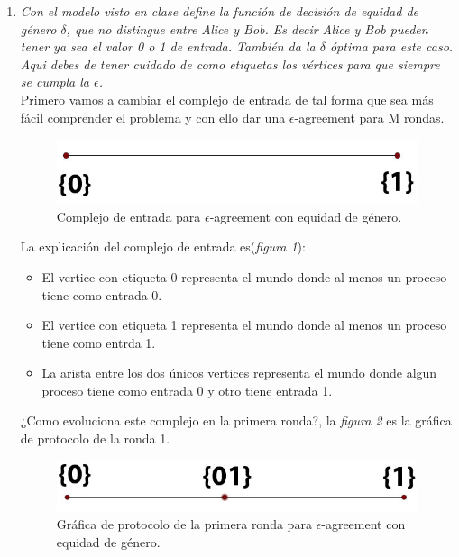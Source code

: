 \documentclass{article}
\begin{document}
\begin{enumerate}
\item{
    \textsl{
    Con el modelo visto en clase define la función de decisión de equidad de género
    $\delta$, que no distingue entre Alice y Bob. Es decir Alice y Bob pueden tener
    ya sea el valor 0 o 1 de entrada. También da la $\delta$ óptima para este caso.
    Aqui debes de tener cuidado de como etiquetas los vértices para que siempre
    se cumpla la $\epsilon$.}\\
  
    Primero vamos a cambiar el complejo de entrada de tal forma que sea más fácil 
    comprender el problema y con ello dar una $\epsilon$-agreement para M rondas.\\
    
     \begin{figure}
       \centering
       \includegraphics[scale=0.25]{2_input.png}
       \caption{Complejo de entrada para $\epsilon$-agreement con equidad de género.}
     \end{figure}

     La explicación del complejo de entrada es(\textit{figura 1}):
     
     \begin{itemize}
       \item{El vertice con etiqueta {0} representa el mundo donde al menos un proceso
           tiene como entrada 0.}
       \item{El vertice con etiqueta {1} representa el mundo donde al menos un proceso
           tiene como entrda 1.}
       \item{La arista entre los dos únicos vertices representa el mundo donde algun 
           proceso tiene como entrada 0 y otro tiene entrada 1.}
     \end{itemize}
  }

  ¿Como evoluciona este complejo en la primera ronda?, la \textit{figura 2} es la
  gráfica de protocolo de la ronda 1.

  \begin{figure}
    \centering
    \includegraphics[scale=0.25]{2_protocol2.png}
    \caption{Gráfica de protocolo de la primera ronda  para $\epsilon$-agreement con equidad de género.}
  \end{figure}
  

\end{enumerate}
\end{document}
